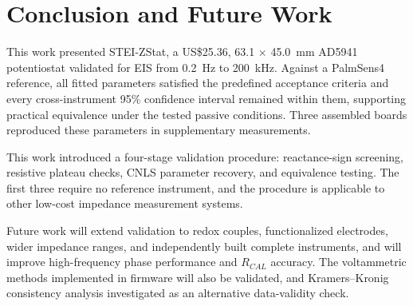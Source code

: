 \section{Conclusion and Future Work}
This work presented STEI-ZStat, a US\$25.36, 63.1 $\times$ 45.0~mm AD5941 potentiostat validated for EIS from 0.2~Hz to 200~kHz. Against a PalmSens4 reference, all fitted parameters satisfied the predefined acceptance criteria and every cross-instrument 95\% confidence interval remained within them, supporting practical equivalence under the tested passive conditions. Three assembled boards reproduced these parameters in supplementary measurements.

This work introduced a four-stage validation procedure: reactance-sign screening, resistive plateau checks, CNLS parameter recovery, and equivalence testing. The first three require no reference instrument, and the procedure is applicable to other low-cost impedance measurement systems.

Future work will extend validation to redox couples, functionalized electrodes, wider impedance ranges, and independently built complete instruments, and will improve high-frequency phase performance and $R_{CAL}$ accuracy. The voltammetric methods implemented in firmware will also be validated, and Kramers--Kronig consistency analysis investigated as an alternative data-validity check.